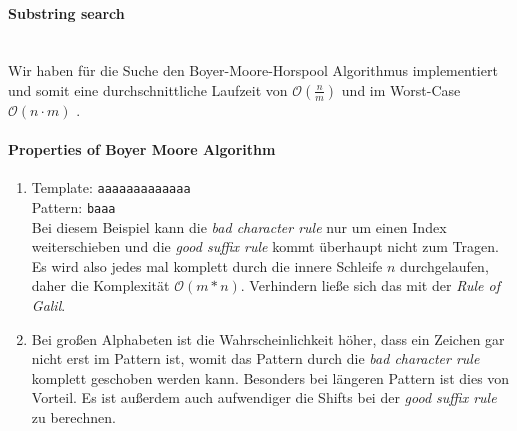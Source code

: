 \documentclass[a4paper,10pt]{article}
\begin{document}
	\paragraph{Substring search}\ \\
	Wir haben für die Suche den Boyer-Moore-Horspool Algorithmus implementiert und somit eine durchschnittliche Laufzeit von $\mathcal{O}(\frac{n}{m})$ und im Worst-Case $\mathcal{O}(n \cdot m)$ .

	\paragraph{Properties of Boyer Moore Algorithm}
	\begin{enumerate}
		\item Template: \verb|aaaaaaaaaaaaa|\\
		Pattern: \verb|baaa|\\
		Bei diesem Beispiel kann die \textit{bad character rule} nur um einen Index weiterschieben und die \textit{good suffix rule} kommt überhaupt nicht zum Tragen. Es wird also jedes mal komplett durch die innere Schleife $n$ durchgelaufen, daher die Komplexität $\mathcal{O}(m*n)$. Verhindern ließe sich das mit der \textit{Rule of Galil}.
		\item Bei großen Alphabeten ist die Wahrscheinlichkeit höher, dass ein Zeichen gar nicht erst im Pattern ist, womit das Pattern durch die \textit{bad character rule} komplett geschoben werden kann. Besonders bei längeren Pattern ist dies von Vorteil. Es ist außerdem auch aufwendiger  die Shifts bei der \textit{good suffix rule} zu berechnen.
		
	\end{enumerate}
\end{document}
